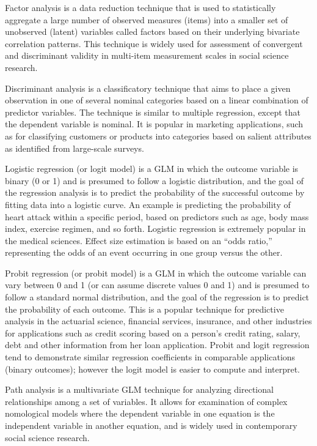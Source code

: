 Factor analysis is a data reduction technique that is used to statistically aggregate a large number of observed measures (items) into a smaller set of unobserved (latent) variables called factors based on their underlying bivariate correlation patterns. This technique is widely used for assessment of convergent and discriminant validity in multi-item measurement scales in social science research.

Discriminant analysis is a classificatory technique that aims to place a given observation in one of several nominal categories based on a linear combination of predictor variables. The technique is similar to multiple regression, except that the dependent variable is nominal. It is popular in marketing applications, such as for classifying customers or products into categories based on salient attributes as identified from large-scale surveys.

Logistic regression (or logit model) is a GLM in which the outcome variable is binary (0 or 1) and is presumed to follow a logistic distribution, and the goal of the regression analysis is to predict the probability of the successful outcome by fitting data into a logistic curve. An example is predicting the probability of heart attack within a specific period, based on predictors such as age, body mass index, exercise regimen, and so forth. Logistic regression is extremely popular in the medical sciences. Effect size estimation is based on an “odds ratio,” representing the odds of an event occurring in one group versus the other.

Probit regression (or probit model) is a GLM in which the outcome variable can vary between 0 and 1 (or can assume discrete values 0 and 1) and is presumed to follow a standard normal distribution, and the goal of the regression is to predict the probability of each outcome. This is a popular technique for predictive analysis in the actuarial science, financial services, insurance, and other industries for applications such as credit scoring based on a person’s credit rating, salary, debt and other information from her loan application. Probit and logit regression tend to demonstrate similar regression coefficients in comparable applications (binary outcomes); however the logit model is easier to compute and interpret.

Path analysis is a multivariate GLM technique for analyzing directional relationships among a set of variables. It allows for examination of complex nomological models where the dependent variable in one equation is the independent variable in another equation, and is widely used in contemporary social science research. 

